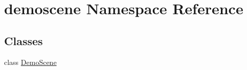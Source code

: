 \hypertarget{namespacedemoscene}{}\section{demoscene Namespace Reference}
\label{namespacedemoscene}
\subsection*{Classes}
\begin{DoxyCompactItemize}
\item 
class \hyperlink{classdemoscene_1_1DemoScene}{Demo\+Scene}
\end{DoxyCompactItemize}
